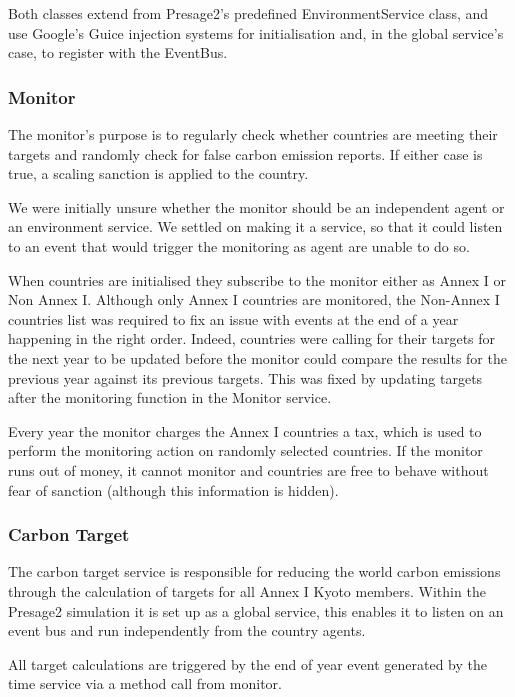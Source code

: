 Both classes extend from Presage2's predefined EnvironmentService class, and use Google's Guice injection systems for initialisation and, in the global service's case, to register with the EventBus.

\subsubsection{Monitor}

The monitor's purpose is to regularly check whether countries are meeting their targets and randomly check for false carbon emission reports. If either case is true, a scaling sanction is applied to the country.

We were initially unsure whether the monitor should be an independent agent or an environment service. We settled on making it a service, so that it could listen to an event that would trigger the monitoring as agent are unable to do so.

When countries are initialised they subscribe to the monitor either as Annex I or Non Annex I. Although only Annex I countries are monitored, the Non-Annex I countries list was required to fix an issue with events at the end of a year happening in the right order. Indeed, countries were calling for their targets for the next year to be updated before the monitor could compare the results for the previous year against its previous targets. This was fixed by updating targets after the monitoring function in the Monitor service.

Every year the monitor charges the Annex I countries a tax, which is used to perform the monitoring action on randomly selected countries. If the monitor runs out of money, it cannot monitor and countries are free to behave without fear of sanction (although this information is hidden).

\subsubsection{Carbon Target}

The carbon target service is responsible for reducing the world carbon emissions through the calculation of targets for all Annex I Kyoto members. Within the Presage2 simulation it is set up as a global service, this enables it to listen on an event bus and run independently from the country agents.
 
All target calculations are triggered by the end of year event generated by the time service via a method call from monitor.

